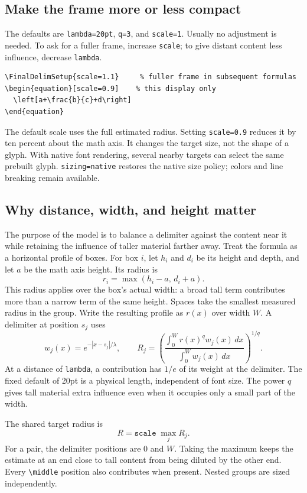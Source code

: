 \documentclass[11pt,a4paper]{article}
\begin{document}
\newpage
\subsection{Make the frame more or less compact}
The defaults are \texttt{lambda=20pt}, \texttt{q=3}, and \texttt{scale=1}.
Usually no adjustment is needed. To ask for a fuller frame, increase
\texttt{scale}; to give distant content less influence, decrease \texttt{lambda}.
\begin{lstlisting}
\FinalDelimSetup{scale=1.1}     % fuller frame in subsequent formulas
\begin{equation}[scale=0.9]    % this display only
  \left[a+\frac{b}{c}+d\right]
\end{equation}
\end{lstlisting}
The default scale uses the full estimated radius. Setting \texttt{scale=0.9}
reduces it by ten percent about the math axis. It changes the target size, not the shape of a glyph. With native font
rendering, several nearby targets can select the same prebuilt glyph.
\texttt{sizing=native} restores the native size policy; colors and line
breaking remain available.

\subsection{Why distance, width, and height matter}
The purpose of the model is to balance a delimiter against the content near
it while retaining the influence of taller material farther away.
Treat the formula as a horizontal profile of boxes. For box $i$, let $h_i$
and $d_i$ be its height and depth, and let $a$ be the math axis height. Its
radius is
\[
 r_i=\max(h_i-a,\,d_i+a).
\]
This radius applies over the box's actual width: a broad tall term contributes
more than a narrow term of the same height. Spaces take the smallest measured
radius in the group. Write the resulting profile as $r(x)$ over width $W$.
A delimiter at position $s_j$ uses
\[
 w_j(x)=e^{-|x-s_j|/\lambda},\qquad
 R_j=\left(\frac{\int_0^W r(x)^q w_j(x)\,dx}
                  {\int_0^W w_j(x)\,dx}\right)^{1/q}.
\]
At a distance of \texttt{lambda}, a contribution has $1/e$ of its weight at
the delimiter. The fixed default of 20pt is a physical length, independent of
font size. The power $q$ gives tall material extra influence even when it
occupies only a small part of the width.

The shared target radius is
\[
 R=\texttt{scale}\;\max_j R_j.
\]
For a pair, the delimiter positions are $0$ and $W$. Taking the maximum keeps
the estimate at an end close to tall content from being diluted by the other
end. Every \verb|\middle| position also contributes when present. Nested
groups are sized independently.
\end{document}
